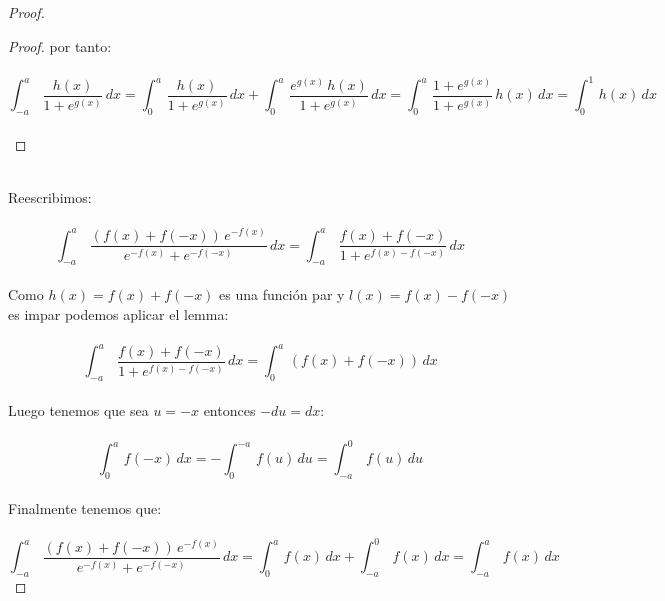 \documentclass[11pt,letterpaper]{article}
\begin{document}
\begin{proof}
\begin{proof}
        por tanto:\,\\
        \,\\
         \begin{equation*}
            \int_{-a}^{a}\,\frac{h(x)}{1+e^{g(x)}}\,dx=\int_{0}^{a}\,\frac{h(x)}{1+e^{g(x)}}\,dx+\int_{0}^{a}\,\frac{e^{g(x)}\,h(x)}{1+e^{g(x)}}\,dx=\int_{0}^{a}\,\frac{1+e^{g(x)}}{1+e^{g(x)}}\,h(x)\,dx=\int_{0}^{1}\,h(x)\,dx
        \end{equation*}\,\\
    \end{proof}\,\\
    Reescribimos:\,\\
    \,\\
    \begin{equation*}
        \int_{-a}^{a}\,\frac{(f(x)+f(-x))\,e^{-f(x)}}{e^{-f(x)}+e^{-f(-x)}}\,dx=\int_{-a}^{a}\,\frac{f(x)+f(-x)}{1+e^{f(x)-f(-x)}}\,dx
    \end{equation*}
    \newpage
    \,\\
    Como $h(x)=f(x)+f(-x)$ es una funci\'on par y $l(x)=f(x)-f(-x)$ es impar podemos aplicar el lemma:\,\\
    \,\\
    \begin{equation*}
        \int_{-a}^{a}\,\frac{f(x)+f(-x)}{1+e^{f(x)-f(-x)}}\,dx=\int_{0}^{a}\,(f(x)+f(-x))\,dx
    \end{equation*}\,\\
    Luego tenemos que sea $u=-x$ entonces $-du=dx$:\,\\
    \,\\
    \begin{equation*}
        \int_{0}^{a}\,f(-x)\,dx=-\int_{0}^{-a}\,f(u)\,du=\int_{-a}^{0}\,f(u)\,du
    \end{equation*}\,\\
    Finalmente tenemos que:\,\\
    \,\\
    \begin{equation*}
        \int_{-a}^{a}\,\frac{(f(x)+f(-x))\,e^{-f(x)}}{e^{-f(x)}+e^{-f(-x)}}\,dx=\int_{0}^{a}\,f(x)\,dx+\int_{-a}^{0}\,f(x)\,dx=\int_{-a}^{a}\,f(x)\,dx
    \end{equation*}
\end{proof}
\end{document}
